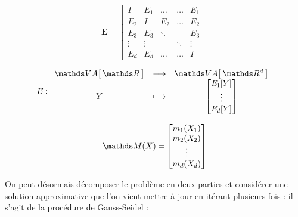 {{        \begin{minipage}{0.33\textwidth}
            \begin{equation*}
                \mathbf E =
                \begin{bmatrix}
                    I           & \mathit E_1 & \dots  & \dots  & \mathit E_1 \\
                    \mathit E_2 & I           & E_2    & \dots  & \mathit E_2 \\
                    \mathit E_3 & \mathit E_3 & \ddots &        & \mathit E_3 \\
                    \vdots      & \vdots      &        & \ddots & \vdots      \\
                    \mathit E_d & \mathit E_d & \dots  & \dots  & I
                \end{bmatrix}
                \label{eq:gam-matrix-E}
            \end{equation*}
        \end{minipage}
        \begin{minipage}{0.35\textwidth}
            \begin{equation*}
                E : \func{\VA{\grandR}}{\VA{\R d}}{Y}{\begin{bmatrix}
                    \mathit E_1[Y] \\
                    \vdots \\
                    \mathit E_d[Y]
                \end{bmatrix}}
            \end{equation*}
        \end{minipage}
        \begin{minipage}{0.25\textwidth}
            \begin{equation*}
                \grandM(X) =
                \begin{bmatrix}
                    m_1(X_1) \\
                    m_2(X_2) \\
                    \vdots   \\
                    m_d(X_d)
                \end{bmatrix}
            \end{equation*}
        \end{minipage}

        \bigskip

        On peut désormais décomposer le problème en deux parties et considérer une solution approximative que l'on vient mettre à jour en itérant plusieurs fois : il s'agit de la procédure de Gauss-Seidel :

}}
